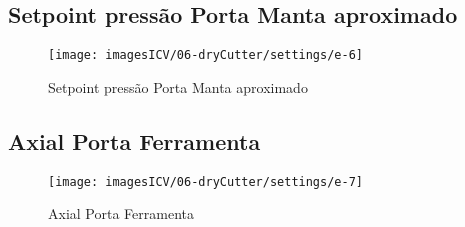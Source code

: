 \subsection{Setpoint pressão Porta Manta aproximado}
\begin{figure}
    \centering
    \texttt{[image: imagesICV/06-dryCutter/settings/e-6]}
    \caption{Setpoint pressão Porta Manta aproximado}
\end{figure}
\newpage
\thispagestyle{fancy}
\vspace{\fill}

\subsection{Axial Porta Ferramenta}
\begin{figure}
    \centering
    \texttt{[image: imagesICV/06-dryCutter/settings/e-7]}
    \caption{Axial Porta Ferramenta}
\end{figure}
